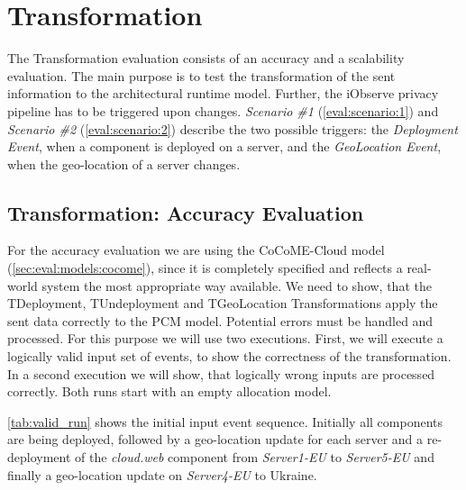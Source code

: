 \section{Transformation}
\label{sec:Evaluation:monitoring}

The Transformation evaluation consists of an accuracy and a scalability evaluation. The main purpose is to test the transformation of the sent information to the architectural runtime model. Further, the iObserve privacy pipeline has to be triggered upon changes. \textit{Scenario \#1} (\autoref{eval:scenario:1}) and \textit{Scenario \#2} (\autoref{eval:scenario:2}) describe the two possible triggers: the \textit{Deployment Event}, when a component is deployed on a server, and the \textit{GeoLocation Event}, when the geo-location of a server changes. 

\subsection{Transformation: Accuracy Evaluation}

For the accuracy evaluation we are using the CoCoME-Cloud model (\autoref{sec:eval:models:cocome}), since it is completely specified and reflects a real-world system the most appropriate way available. We need to show, that the TDeployment, TUndeployment and TGeoLocation Transformations apply the sent data correctly to the PCM model. Potential errors must be handled and processed. For this purpose we will use two executions. First, we will execute a logically valid input set of events, to show the correctness of the transformation. In a second execution we will show, that logically wrong inputs are processed correctly. Both runs start with an empty allocation model.

\autoref{tab:valid_run} shows the initial input event sequence. Initially all components are being deployed, followed by a geo-location update for each server and a re-deployment of the \textit{cloud.web} component from \textit{Server1-EU} to \textit{Server5-EU} and finally a geo-location update on \textit{Server4-EU} to Ukraine.

